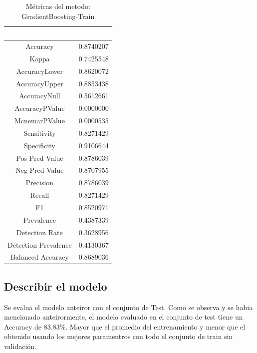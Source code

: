 \documentclass[]{article}
\begin{document}
\begin{table}[!h]

\caption{\label{tab:metricas_GradientBoosting-Train}Métricas del metodo: GradientBoosting-Train }
\centering
\begin{tabular}[t]{cc}
\toprule
\rowcolor{black}  \multicolumn{1}{c}{\textcolor{white}{\textbf{metricas}}} & \multicolumn{1}{c}{\textcolor{white}{\textbf{valor}}}\\
\midrule
\rowcolor{gray!6}  Accuracy & 0.8740207\\
Kappa & 0.7425548\\
\rowcolor{gray!6}  AccuracyLower & 0.8620072\\
AccuracyUpper & 0.8853438\\
\rowcolor{gray!6}  AccuracyNull & 0.5612661\\
\addlinespace
AccuracyPValue & 0.0000000\\
\rowcolor{gray!6}  McnemarPValue & 0.0000535\\
Sensitivity & 0.8271429\\
\rowcolor{gray!6}  Specificity & 0.9106644\\
Pos Pred Value & 0.8786039\\
\addlinespace
\rowcolor{gray!6}  Neg Pred Value & 0.8707955\\
Precision & 0.8786039\\
\rowcolor{gray!6}  Recall & 0.8271429\\
F1 & 0.8520971\\
\rowcolor{gray!6}  Prevalence & 0.4387339\\
\addlinespace
Detection Rate & 0.3628956\\
\rowcolor{gray!6}  Detection Prevalence & 0.4130367\\
Balanced Accuracy & 0.8689036\\
\bottomrule
\end{tabular}
\end{table}

\hypertarget{describir-el-modelo-6}{%
\subsection{Describir el modelo}\label{describir-el-modelo-6}}

Se evalua el modelo anteiror con el conjunto de Test. Como se observa y
se habia mencionado anteirormente, el modelo evaluado en el conjunto de
test tiene un Accuracy de 83.83\%. Mayor que el promedio del
entrenamiento y menor que el obtenido usando los mejores paramentros con
todo el conjunto de train sin validación.
\end{document}
